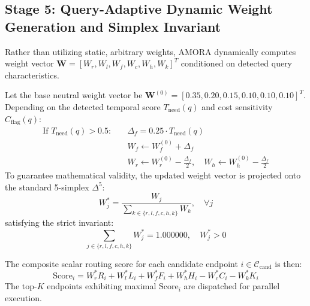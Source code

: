 \subsection{Stage 5: Query-Adaptive Dynamic Weight Generation and Simplex Invariant}
Rather than utilizing static, arbitrary weights, AMORA dynamically computes weight vector $\mathbf{W} = [W_r, W_l, W_f, W_c, W_h, W_k]^T$ conditioned on detected query characteristics. 

Let the base neutral weight vector be $\mathbf{W}^{(0)} = [0.35, 0.20, 0.15, 0.10, 0.10, 0.10]^T$. Depending on the detected temporal score $T_{\text{need}}(q)$ and cost sensitivity $C_{\text{flag}}(q)$:
\begin{equation}
    \begin{aligned}
        \text{If } T_{\text{need}}(q) > 0.5: \quad & \Delta_f = 0.25 \cdot T_{\text{need}}(q) \\
        & W_f \leftarrow W_f^{(0)} + \Delta_f \\
        & W_r \leftarrow W_r^{(0)} - \frac{\Delta_f}{2}, \quad W_h \leftarrow W_h^{(0)} - \frac{\Delta_f}{2}
    \end{aligned}
\end{equation}
To guarantee mathematical validity, the updated weight vector is projected onto the standard 5-simplex $\Delta^5$:
\begin{equation}
    W_j^* = \frac{W_j}{\sum_{k \in \{r, l, f, c, h, k\}} W_k}, \quad \forall j
    \label{eq:simplex_norm}
\end{equation}
satisfying the strict invariant:
\begin{equation}
    \sum_{j \in \{r, l, f, c, h, k\}} W_j^* = 1.000000, \quad W_j^* > 0
\end{equation}

The composite scalar routing score for each candidate endpoint $i \in \mathcal{C}_{\text{cand}}$ is then:
\begin{equation}
    \text{Score}_i = W_r^* R_i + W_l^* L_i + W_f^* F_i + W_h^* H_i - W_c^* C_i - W_k^* K_i
    \label{eq:composite_score}
\end{equation}
The top-$K$ endpoints exhibiting maximal $\text{Score}_i$ are dispatched for parallel execution.

